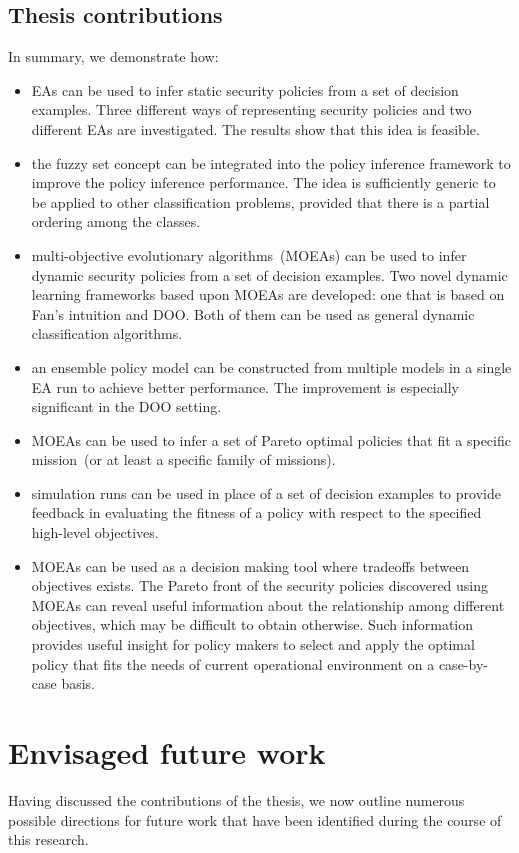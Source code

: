 \subsection{Thesis contributions}
In summary, we demonstrate how:
\begin{itemize}
\item EAs can be used to infer static security policies from a set of
  decision examples. Three different ways of representing security
  policies and two different EAs are investigated. The results show
  that this idea is feasible.
\item the fuzzy set concept can be integrated into the policy
  inference framework to improve the policy inference performance. The
  idea is sufficiently generic to be applied to other classification
  problems, provided that there is a partial ordering among the
  classes.
\item multi-objective evolutionary algorithms~(MOEAs) can be used to
  infer dynamic security policies from a set of decision examples. Two
  novel dynamic learning frameworks based upon MOEAs are developed:
  one that is based on Fan's intuition and DOO. Both of them can be
  used as general dynamic classification algorithms.
\item an ensemble policy model can be constructed from multiple models
  in a single EA run to achieve better performance. The improvement is
  especially significant in the DOO setting.
\item MOEAs can be used to infer a set of Pareto optimal policies that
  fit a specific mission~(or at least a specific family of missions).
\item simulation runs can be used in place of a set of decision
  examples to provide feedback in evaluating the fitness of a policy
  with respect to the specified high-level objectives.
\item MOEAs can be used as a decision making tool where tradeoffs
  between objectives exists. The Pareto front of the security policies
  discovered using MOEAs can reveal useful information about the
  relationship among different objectives, which may be difficult to
  obtain otherwise. Such information provides useful insight for
  policy makers to select and apply the optimal policy that fits the
  needs of current operational environment on a case-by-case basis.
\end{itemize}

\section{Envisaged future work}
Having discussed the contributions of the thesis, we now outline
numerous possible directions for future work that have been identified
during the course of this research.

